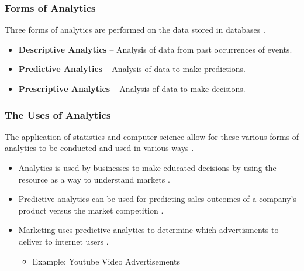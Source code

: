 \documentclass{beamer}
\begin{document}
\begin{frame}
\frametitle{Forms of Analytics}

Three forms of analytics are performed on the data stored in databases \cite{Jeble2016}.
\begin{itemize}

    \item \textbf{Descriptive Analytics} -- Analysis of data from past occurrences of events.

    \item \textbf{Predictive Analytics} -- Analysis of data to make predictions.
    \item \textbf{Prescriptive Analytics} -- Analysis of data to make decisions.

\end{itemize}


\end{frame}

\begin{frame}
\frametitle{The Uses of Analytics}

The application of statistics and computer science allow for these various forms of analytics to be conducted and used in various ways \cite{Jeble2016}.

\begin{itemize}
    \item Analytics is used by businesses to make educated decisions by using the resource as a way to understand markets \cite{Jeble2016}.
    \item Predictive analytics can be used for predicting sales outcomes of a company's product versus the market competition \cite{Jeble2016}.
    \item Marketing uses predictive analytics to determine which advertisments to deliver to internet users \cite{Jeble2016}.
        \begin{itemize}
        \item Example: Youtube Video Advertisements 
        \end{itemize}
\end{itemize}
\end{frame}
\end{document}
